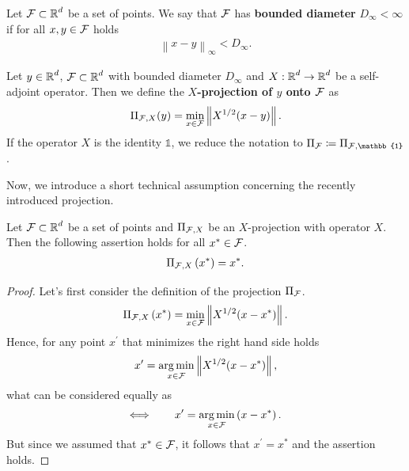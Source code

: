 \begin{definition}
Let $\operatorname{\mathcal{F}}\subset\operatorname{\mathbb{R}}^d$ be a set of points. We say that $\operatorname{\mathcal{F}}$ has \textbf{bounded diameter} $D_{\infty}<\infty$ if for all $x,y \in \operatorname{\mathcal{F}}$ holds
\begin{align*}
\left\|x - y \right\|_{\infty} < D_{\infty}.
\end{align*}
\end{definition}

\begin{definition}\label{def:projection}
Let $y\in\operatorname{\mathbb{R}}^d$, $\operatorname{\mathcal{F}}\subset\operatorname{\mathbb{R}}^d$ with bounded diameter $D_{\infty}$ and $X:\operatorname{\mathbb{R}}^d\to\operatorname{\mathbb{R}}^d$ be a self-adjoint operator. Then we define the \textbf{$X$-projection of $y$ onto $\operatorname{\mathcal{F}}$} as
\begin{align*}
\Pi_{\operatorname{\mathcal{F}},X} (y) = \min_{x\in\operatorname{\mathcal{F}}} \left\|X^{1/2}(x - y) \right\|.
\end{align*}
If the operator $X$ is the identity $\mathbb{1}$, we reduce the notation to $\Pi_{\F} \coloneqq \Pi_{\F,\mathbb{1}}$.
\end{definition}

Now, we introduce a short technical assumption concerning the recently introduced projection.

\begin{lemma}\label{lemma:projection}
Let $\operatorname{\mathcal{F}}\subset\operatorname{\mathbb{R}}^d$ be a set of points and $\Pi_{\operatorname{\mathcal{F}}, X}$ be an $X$-projection with operator $X$.\\
Then the following assertion holds for all $x^{\ast}\in \operatorname{\mathcal{F}}$.
\begin{align*}
\Pi_{\operatorname{\mathcal{F}}, X} \left(x^{\ast}\right) = x^{\ast}.
\end{align*}
\end{lemma}

\begin{proof}
Let's first consider the definition of the projection $\Pi_{\operatorname{\mathcal{F}}}$.
\begin{align*}
\Pi_{\operatorname{\mathcal{F}}, X} \left(x^{\ast}\right) = \min_{x\in\operatorname{\mathcal{F}}} \left\|X^{1/2}(x - x^{\ast}) \right\|.
\end{align*}
Hence, for any point $x^{\prime}$ that minimizes the right hand side holds
\begin{align*}
x^{\prime} = \operatorname*{arg\,min}_{x\in\operatorname{\mathcal{F}}}\left\|X^{1/2}(x - x^{\ast}) \right\|,
\end{align*}
what can be considered equally as
\begin{align*}
\Longleftrightarrow \qquad x^{\prime} = \operatorname*{arg\,min}_{x\in\operatorname{\mathcal{F}}}\left(x - x^{\ast}\right).
\end{align*}
But since we assumed that $x^{\ast}\in\operatorname{\mathcal{F}}$, it follows that $x^{\prime} = x^{\ast}$ and the assertion holds.
\end{proof}

